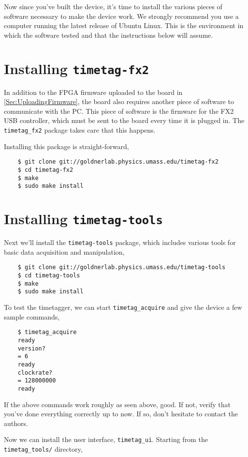 Now since you've built the device, it's time to install the various
pieces of software necessary to make the device work. We strongly
recommend you use a computer running the latest release of Ubuntu
Linux. This is the environment in which the software tested and that
the instructions below will assume.

\section{Installing {\tt timetag-fx2}}
In addition to the FPGA firmware uploaded to the board in
\ref{Sec:UploadingFirmware}, the board also requires another piece of
software to communicate with the PC. This piece of software is the
firmware for the FX2 USB controller, which must be sent to the board
every time it is plugged in. The {\tt timetag\_fx2} package takes care
that this happens.

Installing this package is straight-forward,

\begin{verbatim}
    $ git clone git://goldnerlab.physics.umass.edu/timetag-fx2
    $ cd timetag-fx2
    $ make
    $ sudo make install
\end{verbatim}

\section{Installing {\tt timetag-tools}}

Next we'll install the {\tt timetag-tools} package, which includes
various tools for basic data acquisition and manipulation,

\begin{verbatim}
    $ git clone git://goldnerlab.physics.umass.edu/timetag-tools
    $ cd timetag-tools
    $ make
    $ sudo make install
\end{verbatim}

To test the timetagger, we can start {\tt timetag\_acquire} and give
the device a few sample commands,

\begin{verbatim}
    $ timetag_acquire
    ready
    version?
    = 6
    ready
    clockrate?
    = 128000000
    ready
\end{verbatim}

If the above commands work roughly as seen above, good. If not, verify
that you've done everything correctly up to now. If so, don't hesitate
to contact the authors.

Now we can install the user interface, {\tt timetag\_ui}. Starting from the
{\tt timetag\_tools/} directory,

